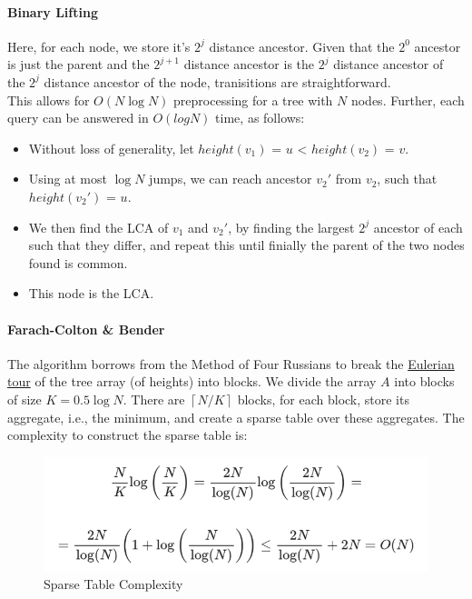\documentclass[12pt]{article}
\begin{document}
\paragraph{Binary Lifting\cite{lca_binary_lifting}}
Here, for each node, we store it's $2^j$ distance ancestor.  
Given that the $2^0$ ancestor is just the parent and the $2^{j+1}$ distance ancestor is the $2^j$ distance ancestor of the $2^j$ distance ancestor of the node, tranisitions are straightforward.  \\
This allows for $O(N\log N)$ preprocessing for a tree with $N$ nodes.  
Further, each query can be answered in $O(log N)$ time, as follows:
\begin{itemize}
  \item Without loss of generality, let $height(v_1)$ = $u$ < $height(v_2)$ = $v$.
  \item Using at most $\log N$ jumps, we can reach ancestor $v_2'$ from $v_2$, such that $height(v_2')$ = $u$.
  \item We then find the LCA of $v_1$ and $v_2'$, by finding the largest $2^j$ ancestor of each such that they differ, and repeat this until finially the parent of the two nodes found is common.  
  \item This node is the LCA.
\end{itemize}

\paragraph{Farach-Colton \& Bender\cite{lca_farachcoltonbender}}
The algorithm borrows from the Method of Four Russians to break the \hyperref[https://usaco.guide/gold/tree-euler?lang=cpp]{Eulerian tour} of the tree array (of heights) into blocks.  
We divide the array $A$ into blocks of size $K = 0.5\log N$. There are $\left\lceil N/K \right\rceil$ blocks, for each block, store its aggregate, i.e., the minimum, and create a sparse table over these aggregates. The complexity to construct the sparse table is:  
\begin{figure}[H]
  \centering
  \includegraphics[width=0.7\linewidth]{sparse-calculations.png}
  \caption{Sparse Table Complexity\cite{lca_farachcoltonbender}}
\end{figure}
\end{document}
